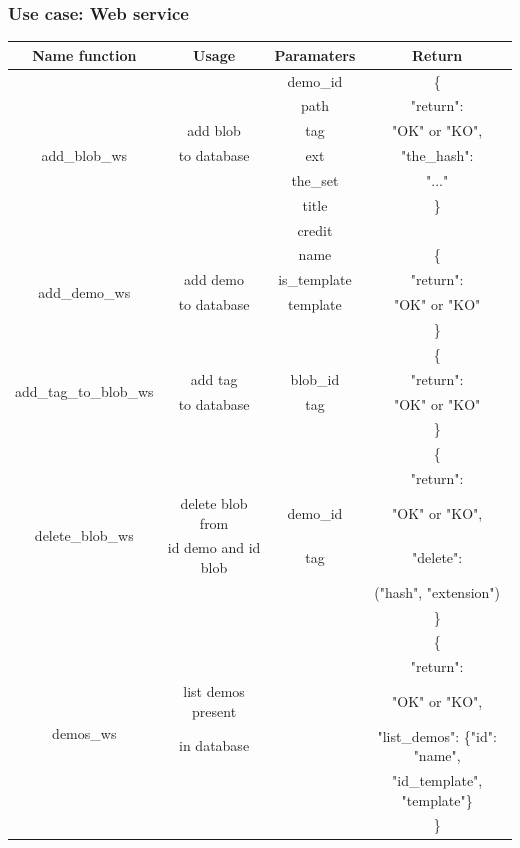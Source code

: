 \subsubsection{Use case: Web service}

\begin{tabular}{|c||c|c|c|}
  \hline
  Name function & Usage & Paramaters & Return \tabularnewline
  \hline
  \multirow{7}{*}{add\_blob\_ws}
  &                      & demo\_id & \{ \\
  &                      & path & "return": \\
  & add blob             & tag  & "OK" or "KO", \\
  & to database          & ext  & "the\_hash": \\
  &                      & the\_set & "..." \\
  &                      & title    & \} \\
  &                      & credit &   \\
  \hline
  \multirow{4}{*}{add\_demo\_ws}
  &                      & name & \{ \\
  & add demo             & is\_template & "return": \\
  & to database          & template & "OK" or "KO" \\
  &                      &      & \} \\
  \hline
  \multirow{4}{*}{add\_tag\_to\_blob\_ws}
  &                      &       & \{ \\
  & add tag              & blob\_id & "return": \\
  & to database          & tag  & "OK" or "KO" \\
  &                      &      & \} \\
  \hline
  \multirow{6}{*}{delete\_blob\_ws}
  &                      &      & \{ \\
  &                      &       & "return": \\
  & delete blob from     & demo\_id & "OK" or "KO", \\
  & id demo and id blob  & tag  & "delete":  \\
  &                      &      & ("hash", "extension")  \\
  &                      &      & \} \\
  \hline
  \multirow{6}{*}{demos\_ws}
  &                      &      & \{ \\
  &                      &      & "return": \\
  & list demos present   &      & "OK" or "KO", \\
  & in database          &      & "list\_demos": \{"id": "name", \\
  &                      &      & "id\_template", "template"\} \\
  &                      &      & \} \\
  \hline
\end{tabular}


